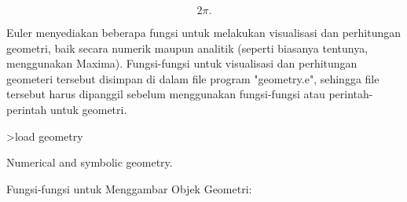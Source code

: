 \documentclass[a4paper,10pt]{article}
\begin{document}
\begin{eulernotebook}
\begin{eulercomment}
\begin{eulercomment}
\begin{eulercomment}
\begin{eulercomment}
\begin{eulercomment}
\begin{eulercomment}
\begin{eulercomment}
\begin{eulercomment}
\begin{eulercomment}
\begin{eulercomment}
\begin{eulercomment}
\begin{eulercomment}
\begin{eulercomment}
\begin{eulercomment}
\begin{eulercomment}
\begin{eulercomment}
\begin{eulercomment}
\begin{eulercomment}
\begin{eulercomment}
\begin{eulercomment}
\begin{eulercomment}
\begin{eulercomment}
\begin{eulercomment}
\begin{eulercomment}
\begin{eulercomment}
\begin{eulercomment}
\begin{eulercomment}
\begin{eulercomment}
\begin{eulercomment}
\end{eulercomment}
\begin{eulerformula}
\[
2\pi.
\]
\end{eulerformula}
\begin{eulercomment}
\begin{eulercomment}
\begin{eulercomment}
Euler menyediakan beberapa fungsi untuk melakukan visualisasi dan
perhitungan geometri, baik secara numerik maupun analitik (seperti
biasanya tentunya, menggunakan Maxima). Fungsi-fungsi untuk
visualisasi dan perhitungan geometeri tersebut disimpan di dalam file
program "geometry.e", sehingga file tersebut harus dipanggil sebelum
menggunakan fungsi-fungsi atau perintah-perintah untuk geometri.
\end{eulercomment}
\begin{eulerprompt}
>load geometry
\end{eulerprompt}
\begin{euleroutput}
  Numerical and symbolic geometry.
\end{euleroutput}
\begin{eulercomment}
Fungsi-fungsi untuk Menggambar Objek Geometri:


\end{eulercomment}
\end{eulercomment}
\end{eulercomment}
\end{eulercomment}
\end{eulercomment}
\end{eulercomment}
\end{eulercomment}
\end{eulercomment}
\end{eulercomment}
\end{eulercomment}
\end{eulercomment}
\end{eulercomment}
\end{eulercomment}
\end{eulercomment}
\end{eulercomment}
\end{eulercomment}
\end{eulercomment}
\end{eulercomment}
\end{eulercomment}
\end{eulercomment}
\end{eulercomment}
\end{eulercomment}
\end{eulercomment}
\end{eulercomment}
\end{eulercomment}
\end{eulercomment}
\end{eulercomment}
\end{eulercomment}
\end{eulercomment}
\end{eulercomment}
\end{eulercomment}
\end{eulernotebook}
\end{document}
